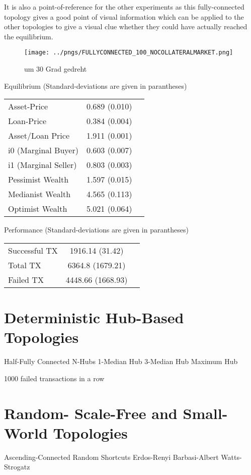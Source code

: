 \documentclass[Bachelorarbeit.tex]{subfiles}
\begin{document}
It is also a point-of-reference for the other experiments as this fully-connected topology gives a good point of visual information which can be applied to the other topologies to give a visual clue whether they could have actually reached the equilibrium.

\begin{figure}[ht]
	\centering
  \texttt{[image: ../pngs/FULLYCONNECTED\_100\_NOCOLLATERALMARKET.png]}
	\caption{um 30 Grad gedreht}
	\label{fig1}
\end{figure}


Equilibrium (Standard-deviations are given in parantheses)

\begin{tabular} { l c r }
	Asset-Price & 0.689 (0.010) \\
	Loan-Price & 0.384 (0.004) \\
	Asset/Loan Price & 1.911 (0.001) \\
	i0 (Marginal Buyer) & 0.603 (0.007) \\
	i1 (Marginal Seller) & 0.803 (0.003) \\
	Pessimist Wealth & 1.597 (0.015) \\
	Medianist Wealth & 4.565 (0.113) \\
	Optimist Wealth & 5.021 (0.064) \\
\end{tabular}

Performance (Standard-deviations are given in parantheses)

\begin{tabular} { l c r }
	Successful TX & 1916.14 (31.42) \\
	Total TX & 6364.8 (1679.21) \\
	Failed TX & 4448.66 (1668.93) \\
\end{tabular}

\section{Deterministic Hub-Based Topologies} 

Half-Fully Connected
N-Hubs
1-Median Hub
3-Median Hub
Maximum Hub

1000 failed transactions in a row

\section{Random- Scale-Free and Small-World Topologies}
Ascending-Connected Random Shortcuts
Erdos-Renyi
Barbasi-Albert
Watts-Strogatz
\end{document}
